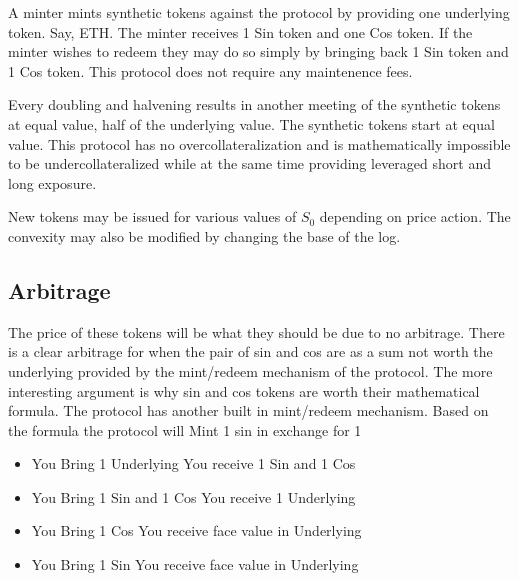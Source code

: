 \documentclass[12pt]{article}
\begin{document}
    A minter mints synthetic tokens against the protocol by providing one underlying token. Say, ETH. The minter receives 1 Sin token and one Cos token. If the minter wishes to redeem they may do so simply by bringing back 1 Sin token and 1 Cos token. This protocol does not require any maintenence fees.

    Every doubling and halvening results in another meeting of the synthetic tokens at equal value, half of the underlying value. The synthetic tokens start at equal value. This protocol has no overcollateralization and is mathematically impossible to be undercollateralized while at the same time providing leveraged short and long exposure.

    New tokens may be issued for various values of $S_0$ depending on price action. The convexity may also be modified by changing the base of the log.

    \subsection{Arbitrage}

    The price of these tokens will be what they should be due to no arbitrage. There is a clear arbitrage for when the pair of sin and cos are as a sum not worth the underlying provided by the mint/redeem mechanism of the protocol. The more interesting argument is why sin and cos tokens are worth their mathematical formula. The protocol has another built in mint/redeem mechanism. Based on the formula the protocol will Mint 1 sin in exchange for 1
    \begin{itemize}
        \item You Bring 1 Underlying You receive 1 Sin and 1 Cos
        \item You Bring 1 Sin and 1 Cos You receive 1 Underlying
        \item You Bring 1 Cos You receive face value in Underlying
        \item You Bring 1 Sin You receive face value in Underlying
    \end{itemize}
\end{document}
